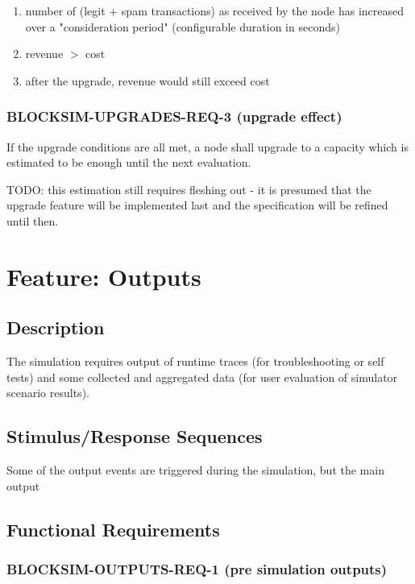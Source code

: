 \documentclass{scrreprt}
\begin{document}
\begin{enumerate}
   \item number of (legit + spam transactions) as received by the node has increased
over a "consideration period" (configurable duration in seconds)

   \item revenue $>$ cost

   \item after the upgrade, revenue would still exceed cost
\end{enumerate}


\subsubsection{BLOCKSIM-UPGRADES-REQ-3 (upgrade effect)}
If the upgrade conditions are all met, a node shall upgrade to a capacity
which is estimated to be enough until the next evaluation.

TODO: this estimation still requires fleshing out - it is presumed that
the upgrade feature will be implemented last and the specification will
be refined until then.



\section{Feature: Outputs}

\subsection{Description}

The simulation requires output of runtime traces (for troubleshooting or
self tests) and some collected and aggregated data (for user evaluation of
simulator scenario results).


\subsection{Stimulus/Response Sequences}

Some of the output events are triggered during the simulation, but the
main output


\subsection{Functional Requirements}


\subsubsection{BLOCKSIM-OUTPUTS-REQ-1 (pre simulation outputs)}
\end{document}
